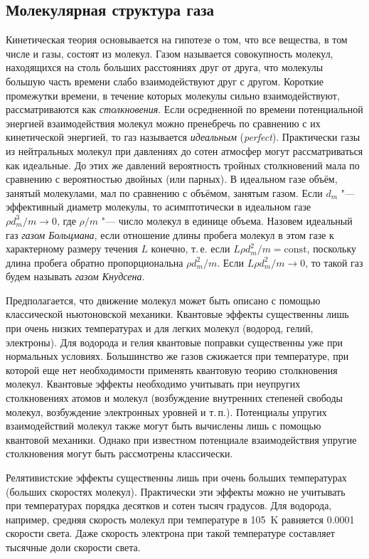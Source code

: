 \subsection{Молекулярная структура газа}
Кинетическая теория основывается на гипотезе о том, что все вещества, в том числе и газы, состоят из молекул.
Газом называется совокупность молекул, находящихся на столь больших расстояниях друг от друга,
что молекулы большую часть времени слабо взаимодействуют друг с другом.
Короткие промежутки времени, в течение которых молекулы сильно взаимодействуют, рассматриваются как \textit{столкновения}.
Если осредненной по времени потенциальной энергией взаимодействия молекул можно пренебречь
по сравнению с их кинетической энергией, то газ называется \textit{идеальным} (\textit{perfect}).
Практически газы из нейтральных молекул при давлениях до сотен атмосфер могут рассматриваться как идеальные.
До этих же давлений вероятность тройных столкновений мала по сравнению с вероятностью двойных (или парных).
В идеальном газе объём, занятый молекулами, мал по сравнению с объёмом, занятым газом.
Если \(d_m\) "--- эффективный диаметр молекулы, то асимптотически в идеальном газе \(\rho d_m^3/m \to 0 \),
где \(\rho/m\) "--- число молекул в единице объема.
Назовем идеальный газ \textit{газом Больцмана}, если отношение длины пробега молекул в этом
газе к характерному размеру течения \(L\) конечно, т.\,е. если \(L\rho d_m^2/m=\mathrm{const}\),
поскольку длина пробега обратно пропорциональна \(\rho d_m^2/m\).
Если \( L\rho d_m^2/m \to 0 \), то такой газ будем называть \textit{газом Кнудсена}.

Предполагается, что движение молекул может быть описано с помощью классической ньютоновской механики.
Квантовые эффекты существенны лишь при очень низких температурах и для легких молекул (водород, гелий, электроны).
Для водорода и гелия квантовые поправки существенны уже при нормальных условиях.
Большинство же газов сжижается при температуре, при которой еще нет необходимости применять квантовую теорию столкновения молекул.
Квантовые эффекты необходимо учитывать при неупругих столкновениях атомов и молекул 
(возбуждение внутренних степеней свободы молекул, возбуждение электронных уровней и т.\,п.).
Потенциалы упругих взаимодействий молекул также могут быть вычислены лишь с помощью квантовой механики.
Однако при известном потенциале взаимодействия упругие столкновения могут быть рассмотрены классически.

Релятивистские эффекты существенны лишь при очень больших температурах (больших скоростях молекул).
Практически эти эффекты можно не учитывать при температурах порядка десятков и сотен тысяч градусов.
Для водорода, например, средняя скорость молекул при температуре в 105~K равняется 0.0001 скорости света.
Даже скорость электрона при такой температуре составляет тысячные доли скорости света.


